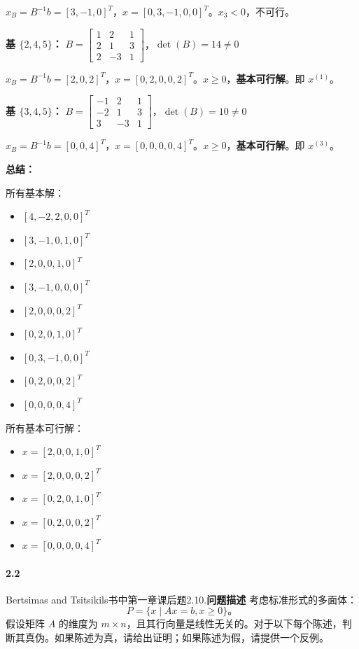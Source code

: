 \documentclass[12pt,a4paper]{article}
\begin{document}
$x_B = B^{-1}b = [3, -1, 0]^T$，$x = [0, 3, -1, 0, 0]^T$。$x_3 < 0$，不可行。

\textbf{基 $\{2,4,5\}$：} $B = \left[\begin{array}{ccc} 1 & 2 & 1 \\ 2 & 1 & 3 \\ 2 & -3 & 1 \end{array}\right]$，$\det(B) = 14 \neq 0$

$x_B = B^{-1}b = [2, 0, 2]^T$，$x = [0, 2, 0, 0, 2]^T$。$x \geq 0$，\textbf{基本可行解}。即 $x^{(1)}$。

\textbf{基 $\{3,4,5\}$：} $B = \left[\begin{array}{ccc} -1 & 2 & 1 \\ -2 & 1 & 3 \\ 3 & -3 & 1 \end{array}\right]$，$\det(B) = 10 \neq 0$

$x_B = B^{-1}b = [0, 0, 4]^T$，$x = [0, 0, 0, 0, 4]^T$。$x \geq 0$，\textbf{基本可行解}。即 $x^{(3)}$。

\textbf{总结：}

所有基本解：
\begin{itemize}
    \item $[4, -2, 2, 0, 0]^T$
    \item $[3, -1, 0, 1, 0]^T$
    \item $[2, 0, 0, 1, 0]^T$
    \item $[3, -1, 0, 0, 0]^T$
    \item $[2, 0, 0, 0, 2]^T$
    \item $[0, 2, 0, 1, 0]^T$
    \item $[0, 3, -1, 0, 0]^T$
    \item $[0, 2, 0, 0, 2]^T$
    \item $[0, 0, 0, 0, 4]^T$
\end{itemize}

所有基本可行解：
\begin{itemize}
    \item $x = [2, 0, 0, 1, 0]^T$
    \item $x = [2, 0, 0, 0, 2]^T$
    \item $x = [0, 2, 0, 1, 0]^T$
    \item $x = [0, 2, 0, 0, 2]^T$
    \item $x = [0, 0, 0, 0, 4]^T$
\end{itemize}

\paragraph{2.2}
Bertsimas and Tsitsikils书中第一章课后题2.10.\textbf{问题描述} 考虑标准形式的多面体：
\[
P = \{ x \mid Ax = b, x \geq 0 \}。
\]
假设矩阵 \( A \) 的维度为 \( m \times n \)，且其行向量是线性无关的。对于以下每个陈述，判断其真伪。如果陈述为真，请给出证明；如果陈述为假，请提供一个反例。
\end{document}

